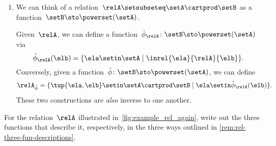 \begin{enumerate}
    \item We can think of a relation~$\relA \setsubseteq \setA \cartprod \setB$ as a function~$\setB  \sto \powerset (\setA)$.

          Given~$\relA$, we can define a function~$\check \phi_{\relA} \colon \setB \sto \powerset (\setA)$ via
          \begin{equation*}
              \check \phi_{\relA} (\elb) = \{ \ela \setin \setA \mid \inrel{\ela}{\relA}{\elb}\}.
          \end{equation*}
          Conversely, given a function~$\check \phi \colon \setB \sto \powerset (\setA)$, we can define
          \begin{equation*}
              \relA_{\check \phi} = \{ \tup{\ela, \elb} \setin \setA \cartprod \setB \mid \ela \setin \check \phi_{\relA}(\elb)\}.
          \end{equation*}
          These two constructions are \emph{also} inverse to one another.
\end{enumerate}

\begin{marginfigure}
    \centering
    \caption{}
    \label{fig:example_rel_again}
\end{marginfigure}
\vfill
\begin{gradedexercise}
    \label{ex:Rel3Functions}
    For the relation~$\relA$ illustrated in~\cref{fig:example_rel_again}, write out the three functions that describe it, respectively, in the three ways outlined in \cref{rem:rel-three-fun-descriptions}.
\end{gradedexercise}

